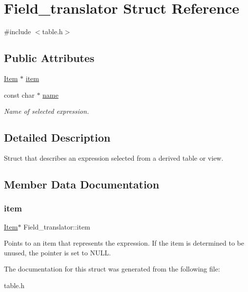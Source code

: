 \hypertarget{structField__translator}{}\section{Field\+\_\+translator Struct Reference}
\label{structField__translator}


{\ttfamily \#include $<$table.\+h$>$}

\subsection*{Public Attributes}
\begin{DoxyCompactItemize}
\item 
\mbox{\hyperlink{classItem}{Item}} $\ast$ \mbox{\hyperlink{structField__translator_aa09e179e9bb5062f24bb2dfa0dea6b33}{item}}
\item 
\mbox{\label{structField__translator_af6a3a338560b993ccecb5b8cab2d6f7e}} 
const char $\ast$ \mbox{\hyperlink{structField__translator_af6a3a338560b993ccecb5b8cab2d6f7e}{name}}
\begin{DoxyCompactList}\small\item\em Name of selected expression. \end{DoxyCompactList}\end{DoxyCompactItemize}


\subsection{Detailed Description}
Struct that describes an expression selected from a derived table or view. 

\subsection{Member Data Documentation}
\mbox{\label{structField__translator_aa09e179e9bb5062f24bb2dfa0dea6b33}} 
\subsubsection{\texorpdfstring{item}{item}}
{\footnotesize\ttfamily \mbox{\hyperlink{classItem}{Item}}$\ast$ Field\+\_\+translator\+::item}

Points to an item that represents the expression. If the item is determined to be unused, the pointer is set to N\+U\+LL. 

The documentation for this struct was generated from the following file\+:\begin{DoxyCompactItemize}
\item 
table.\+h\end{DoxyCompactItemize}
